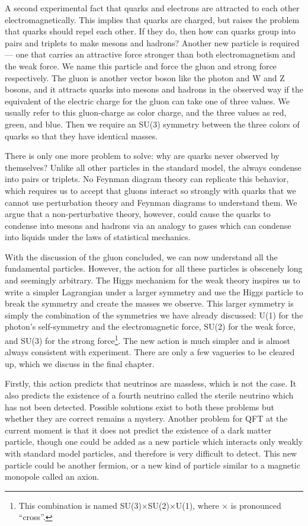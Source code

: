 A second experimental fact that quarks and electrons are attracted to each other electromagnetically. This implies that quarks are charged, but raises the problem that quarks should repel each other. If they do, then how can quarks group into pairs and triplets to make mesons and hadrons? Another new particle is required --- one that carries an attractive force stronger than both electromagnetism and the weak force. We name this particle and force the gluon and strong force respectively. The gluon is another vector boson like the photon and W and Z bosons, and it attracts quarks into mesons and hadrons in the observed way if the equivalent of the electric charge for the gluon can take one of three values. We usually refer to this gluon-charge as color charge, and the three values as red, green, and blue. Then we require an SU(3) symmetry between the three colors of quarks so that they have identical masses.

There is only one more problem to solve: why are quarks never observed by themselves? Unlike all other particles in the standard  model, the always condense into pairs or triplets. No Feynman diagram theory can replicate this behavior, which requires us to accept that gluons interact so strongly with quarks that we cannot use perturbation theory and Feynman diagrams to understand them. We argue that a non-perturbative theory, however, could cause the quarks to condense into mesons and hadrons via an analogy to gases which can condense into liquids under the laws of statistical mechanics.

With the discussion of the gluon concluded, we can now understand all the fundamental particles. However, the action for all these particles is obscenely long and seemingly arbitrary. The Higgs mechanism for the weak theory inspires us to write a simpler Lagrangian under a larger symmetry and use the Higgs particle to break the symmetry and create the masses we observe. This larger symmetry is simply the combination of the symmetries we have already discussed: U(1) for the photon's self-symmetry and the electromagnetic force, SU(2) for the weak force, and SU(3) for the strong force\footnote{This combination is named SU(3)$\times$SU(2)$\times$U(1), where $\times$ is pronounced ``cross''.}. The new action is much simpler and is almost always consistent with experiment. There are only a few vagueries to be cleared up, which we discuss in the final chapter.

Firstly, this action predicts that neutrinos are massless, which is not the case. It also predicts the existence of a fourth neutrino called the sterile neutrino which has not been detected. Possible solutions exist to both these problems but whether they are correct remains a mystery. Another problem for QFT at the current moment is that it does not predict the existence of a dark matter particle, though one could be added as a new particle which interacts only weakly with standard model particles, and therefore is very difficult to detect. This new particle could be another fermion, or a new kind of particle similar to a magnetic monopole called an axion.

